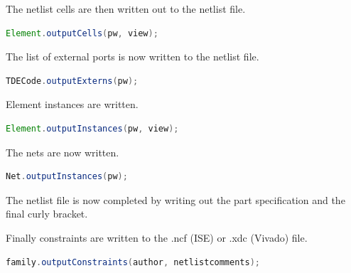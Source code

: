     The netlist cells are then written out to the netlist file.
    
    \begin{lstlisting}[gobble=8, language=java]
        Element.outputCells(pw, view);
    \end{lstlisting}

    The list of external ports is now written to the netlist file.
    
    \begin{lstlisting}[gobble=8, language=java]
        TDECode.outputExterns(pw);
    \end{lstlisting}

    Element instances are written.
   
    \begin{lstlisting}[gobble=8, language=java]
        Element.outputInstances(pw, view);
    \end{lstlisting}

    The nets are now written.
    
    \begin{lstlisting}[gobble=8, language=java]
        Net.outputInstances(pw);
    \end{lstlisting}

    The netlist file is now completed by writing out the part specification
    and the final curly bracket.
    
    Finally constraints are written to the .ncf (ISE) or .xdc (Vivado) file.

    \begin{lstlisting}[gobble=8, language=java]
        family.outputConstraints(author, netlistcomments);
    \end{lstlisting}


